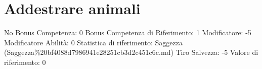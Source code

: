 \section{Addestrare animali}\label{addestrare-animali}

\begin{description}
\tightlist
\item[Tags: ABI]
No Bonus Competenza: 0 Bonus Competenza di Riferimento: 1 Modificatore:
-5 Modificatore Abilità: 0 Statistica di riferimento: Saggezza
(Saggezza\%20bf4088d7986941e28251cb3d2c451c6c.md) Tiro Salvezza: -5
Valore di riferimento: 0
\end{description}
